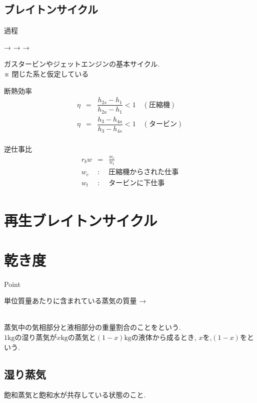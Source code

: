\documentclass[a4paper]{jsarticle}
\begin{document}
\subsection{ブレイトンサイクル}
\begin{itembox}[l]{過程}
    \begin{center}
        \quad → \quad {} \quad → \quad {} \quad → \quad {}
    \end{center}
\end{itembox}
ガスタービンやジェットエンジンの基本サイクル.\\
※ 閉じた系と仮定している
\begin{itembox}[l]{断熱効率}
    \begin{eqnarray*}
        \eta &=& \dfrac{h_{2s}-h_1}{h_{2a}-h_1} <1 \quad (圧縮機)\\
        \eta &=& \dfrac{h_3-h_{4a}}{h_3-h_{4s}} <1 \quad (タービン)\\
    \end{eqnarray*}
\end{itembox}
\begin{itembox}[l]{逆仕事比}
    \begin{eqnarray*}
        r_bw &=& \frac{w_c}{w_t}\\
        w_c&:&圧縮機からされた仕事\\
        w_t&:&タービンに下仕事\\
    \end{eqnarray*}
\end{itembox}
\section{再生ブレイトンサイクル}
\section{乾き度}
\begin{itembox}[l]{Point}
    \begin{center}
        単位質量あたりに含まれている蒸気の質量 → 
    \end{center}
\end{itembox}
\\
蒸気中の気相部分と液相部分の重量割合のことをという.\\
$1\mathrm{kg}$の湿り蒸気が$x\mathrm{kg}$の蒸気と$\left(1-x\right)\mathrm{kg}$の液体から成るとき,
$x$を,$\left(1-x\right)$をという.

\subsection{湿り蒸気}
飽和蒸気と飽和水が共存している状態のこと.
\end{document}
